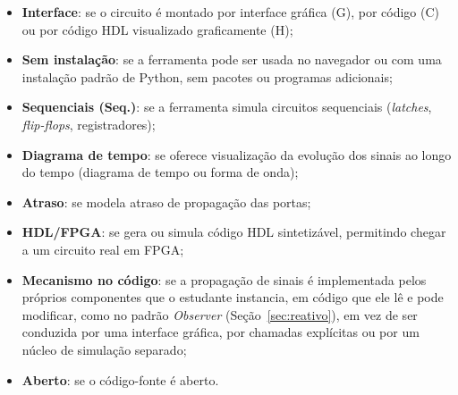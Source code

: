 \begin{itemize}
    \item \textbf{Interface}: se o circuito é montado por interface gráfica (G), por código (C) ou por código HDL visualizado graficamente (H);
    \item \textbf{Sem instalação}: se a ferramenta pode ser usada no navegador ou com uma instalação padrão de Python, sem pacotes ou programas adicionais;
    \item \textbf{Sequenciais (Seq.)}: se a ferramenta simula circuitos sequenciais (\textit{latches}, \textit{flip-flops}, registradores);
    \item \textbf{Diagrama de tempo}: se oferece visualização da evolução dos sinais ao longo do tempo (diagrama de tempo ou forma de onda);
    \item \textbf{Atraso}: se modela atraso de propagação das portas;
    \item \textbf{HDL/FPGA}: se gera ou simula código HDL sintetizável, permitindo chegar a um circuito real em FPGA;
    \item \textbf{Mecanismo no código}: se a propagação de sinais é implementada pelos próprios componentes que o estudante instancia, em código que ele lê e pode modificar, como no padrão \textit{Observer} (Seção~\ref{sec:reativo}), em vez de ser conduzida por uma interface gráfica, por chamadas explícitas ou por um núcleo de simulação separado;
    \item \textbf{Aberto}: se o código-fonte é aberto.
\end{itemize}

